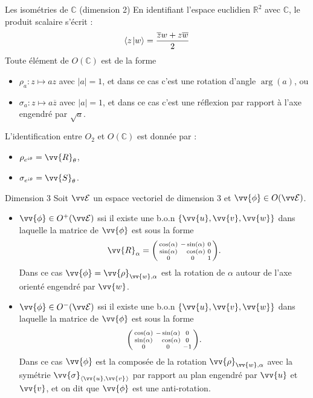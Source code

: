 \documentclass{m53beamer}
\begin{document}
\begin{frame}{Les isométries de $\mathbb{C}$ (dimension 2)}
  En identifiant l'espace euclidien $\mathbb{R}^{2}$ avec $\mathbb{C}$, le produit scalaire s'écrit :
  \[
    \langle{z}\kern1pt |{w}\rangle = \frac{\overline{z}w+z\overline{w}}{2}
  \]\pause
  Toute élément de $O(\mathbb{C})$ est de la forme\pause
  \begin{itemize}[<.(1)->]
    \item $\rho_{a} : z \mapsto az$ avec $|a| =1$, et dans ce cas c'est une rotation d'angle $\arg(a)$\pause, ou
    \item $\sigma_{a} : z \mapsto a\overline{z}$ avec $|a| =1$, et dans ce cas c'est une réflexion par rapport à l'axe engendré par $\sqrt{a}$.
  \end{itemize}\pause
  L'identification entre $O_{2}$ et $O(\mathbb{C})$ est donnée par :
  \begin{itemize}[<+(1)->]
    \item $\rho_{e^{i\theta}}=\vv{R}_{\theta}$,
    \item $\sigma_{e^{i\theta}}=\vv{S}_{\theta}$.
  \end{itemize}
\end{frame}

\begin{frame}{Dimension 3}
  Soit $\ev{E}$ un espace vectoriel de dimension $3$ et $\vv{\phi} \in O(\ev{E})$.
  \begin{itemize}[<+(1)->]
    \item $\vv{\phi} \in O^{+}(\ev{E})$ ssi il existe une b.o.n $\{\vv{u},\vv{v},\vv{w}\}$ dans laquelle la matrice de $\vv{\phi}$ est sous la forme
    \[
      \vv{R}_{\alpha}=
        \begin{psmallmatrix}
          \cos(\alpha)&-\sin(\alpha)&0\\
          \sin(\alpha)&\phantom{-}\cos(\alpha)&0\\
          0&0&1
        \end{psmallmatrix}.
    \]\pause
    Dans ce cas $\vv{\phi} = \vv{\rho}_{\vv{w},\alpha}$ est la rotation de $\alpha$ autour de l'axe orienté engendré par $\vv{w}$.
    \item $\vv{\phi} \in O^{-}(\ev{E})$ ssi il existe une b.o.n $\{\vv{u},\vv{v},\vv{w}\}$ dans laquelle la matrice de $\vv{\phi}$ est sous la forme
    \[
      \begin{psmallmatrix}
        \cos(\alpha)&-\sin(\alpha)&0\\
        \sin(\alpha)&\phantom{-}\cos(\alpha)&0\\
        0&0&-1
      \end{psmallmatrix}.
    \]\pause
    Dans ce cas $\vv{\phi}$ est la composée de la rotation $\vv{\rho}_{\vv{w},\alpha}$ avec la symétrie $\vv{\sigma}_{\affspan{\vv{u},\vv{v}}}$ par rapport au plan engendré par $\vv{u}$ et $\vv{v}$, et on dit que $\vv{\phi}$ est une \alert{anti-rotation}.
  \end{itemize}
\end{frame}
\end{document}
